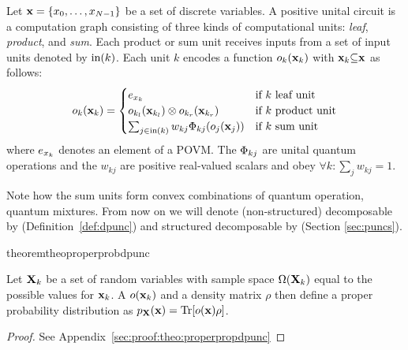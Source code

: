\begin{definition}
	\label{def:dpunc}
	Let   $\mathbf{x} = \{x_0, \allowbreak \dots ,\allowbreak x_{N{-}1}  \}$ be a set of discrete variables.
	A positive unital circuit is a computation graph consisting of three kinds of computational units:
	\textit{leaf}, \textit{product}, and \textit{sum}.
	Each product or sum unit receives inputs from a set of input units denoted by $\text{in}(k)$.
	Each unit $k$ encodes a function $o_{k}(\mathbf{x}_k)$ with $\mathbf{x}_k {\subseteq} \mathbf{x}$ as follows:
	\begin{align*}
		{\ensuremath{o}}_k(\mathbf{x}_k)=
		\begin{cases}
			e_{x_k}                                                           & \text{if $k$ leaf unit}    \\
			o_{k_l}(\mathbf{x}_{k_l}) \otimes o_{k_r}  (\mathbf{x}_{k_r}) & \text{if $k$ product unit} \\
			\sum_{j\in\text{in}(k)} w_{kj} \Phi_{kj} (o_j(\mathbf{x}_j) ) & \text{if $k$ sum unit}
		\end{cases}
	\end{align*}
	where $e_{x_k}$  denotes an element of a POVM. The $\Phi_{kj}$ are unital quantum operations and the $w_{kj}$ are positive real-valued scalars and obey $\forall k: \sum_j w_{kj} {=}1$.
\end{definition}



Note how the sum units form convex combinations of quantum operation, \ie quantum mixtures.
From now on we will denote (non-structured) decomposable \puncs by \dpuncs (\cf Definition~\ref{def:dpunc}) and structured decomposable \puncs by \sdpuncs (\cf Section \ref{sec:puncs}).



\begin{restatable}{theorem}{theoproperprobdpunc}
	\label{theo:properprobdpunc}

	Let $\mathbf{X}_k$ be a set of random variables with sample space $\Omega(\mathbf{X}_k)$ equal to the possible values for $\mathbf{x}_k$.
	A \dpunc $o(\mathbf{x}_k)$ and a density matrix $\rho$ then define a proper probability distribution as
	$
		p_{\mathbf{X}}(\mathbf{x}) = \Tr [o(\mathbf{x}) \rho]
		\label{eq:theo:prob_operator_nsd}
	$.
\end{restatable}
\begin{proof}
	See Appendix~\ref{sec:proof:theo:properpropdpunc}
\end{proof}





